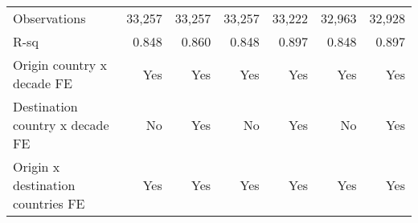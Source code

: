 \begin{tabular}{l*{6}{r}}
Observations        &      33,257         &      33,257         &      33,257         &      33,222         &      32,963         &      32,928         \\
R-sq                &       0.848         &       0.860         &       0.848         &       0.897         &       0.848         &       0.897         \\
Origin country x decade FE&         Yes         &         Yes         &         Yes         &         Yes         &         Yes         &         Yes         \\
Destination country x decade FE&          No         &         Yes         &          No         &         Yes         &          No         &         Yes         \\
Origin x destination countries FE&         Yes         &         Yes         &         Yes         &         Yes         &         Yes         &         Yes         \\
\bottomrule \end{tabular}
